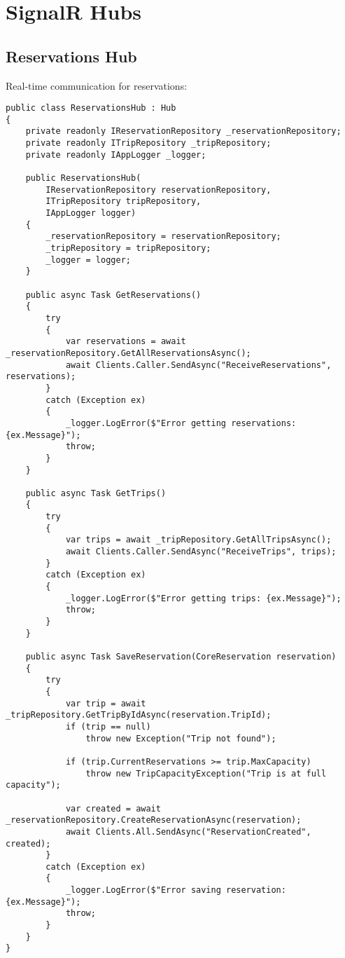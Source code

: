 \section{SignalR Hubs}

\subsection{Reservations Hub}
Real-time communication for reservations:

\begin{lstlisting}[language=CSharp]
public class ReservationsHub : Hub
{
    private readonly IReservationRepository _reservationRepository;
    private readonly ITripRepository _tripRepository;
    private readonly IAppLogger _logger;

    public ReservationsHub(
        IReservationRepository reservationRepository,
        ITripRepository tripRepository,
        IAppLogger logger)
    {
        _reservationRepository = reservationRepository;
        _tripRepository = tripRepository;
        _logger = logger;
    }

    public async Task GetReservations()
    {
        try
        {
            var reservations = await _reservationRepository.GetAllReservationsAsync();
            await Clients.Caller.SendAsync("ReceiveReservations", reservations);
        }
        catch (Exception ex)
        {
            _logger.LogError($"Error getting reservations: {ex.Message}");
            throw;
        }
    }

    public async Task GetTrips()
    {
        try
        {
            var trips = await _tripRepository.GetAllTripsAsync();
            await Clients.Caller.SendAsync("ReceiveTrips", trips);
        }
        catch (Exception ex)
        {
            _logger.LogError($"Error getting trips: {ex.Message}");
            throw;
        }
    }

    public async Task SaveReservation(CoreReservation reservation)
    {
        try
        {
            var trip = await _tripRepository.GetTripByIdAsync(reservation.TripId);
            if (trip == null)
                throw new Exception("Trip not found");

            if (trip.CurrentReservations >= trip.MaxCapacity)
                throw new TripCapacityException("Trip is at full capacity");

            var created = await _reservationRepository.CreateReservationAsync(reservation);
            await Clients.All.SendAsync("ReservationCreated", created);
        }
        catch (Exception ex)
        {
            _logger.LogError($"Error saving reservation: {ex.Message}");
            throw;
        }
    }
}
\end{lstlisting}


